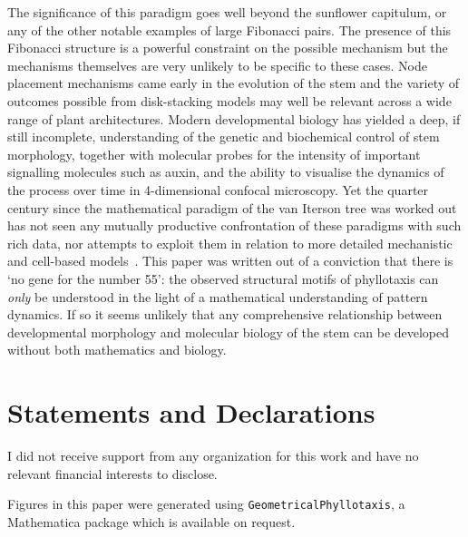 \documentclass[a4paper,10pt]{amsart}
\begin{document}
The significance of this paradigm goes well beyond the sunflower capitulum, or any of the other notable examples of large Fibonacci pairs.  The presence of this Fibonacci structure is a powerful constraint on the possible mechanism but the mechanisms themselves are very unlikely to be specific to these cases. Node placement mechanisms came early in the evolution of the stem and the variety of outcomes possible from disk-stacking models may well be relevant across a wide range of plant architectures. Modern developmental biology has yielded a  deep, if still incomplete, understanding of the genetic and biochemical control of stem morphology, together with molecular probes for the intensity of important signalling  molecules such as auxin, and the ability to visualise the dynamics of the process over time in 4-dimensional confocal microscopy.  Yet the quarter century since the mathematical paradigm of the van Iterson tree was worked out has not seen any mutually productive confrontation of these paradigms with such rich data, nor attempts to exploit them in relation to more detailed mechanistic and cell-based models~\cite{newellFibonacciPatternsCommon2013}. This paper was written out of a conviction that there is `no gene for the number 55': the observed structural motifs of phyllotaxis can \textit{only} be understood in the light of a mathematical understanding of pattern dynamics. If so it seems unlikely that any comprehensive relationship between developmental morphology and molecular biology of the stem can be developed without both mathematics and biology. 



\section*{Statements and Declarations} 
I did not receive support from any organization for this work and have no relevant financial interests to disclose. 

Figures in this paper were generated using \texttt{GeometricalPhyllotaxis}, a Mathematica package which is available on request. 
\printbibliography
\end{document}
